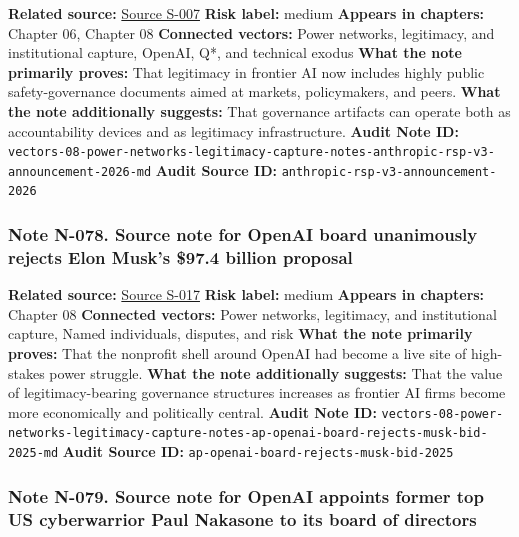 \documentclass[
  american,
  11pt,
  letterpaper,
]{article}
\begin{document}
\textbf{Related source:}
\hyperref[source-s-007-responsible-scaling-policy-version-3-0]{Source
S-007} \textbf{Risk label:} medium \textbf{Appears in chapters:} Chapter
06, Chapter 08 \textbf{Connected vectors:} Power networks, legitimacy,
and institutional capture, OpenAI, Q*, and technical exodus \textbf{What
the note primarily proves:} That legitimacy in frontier AI now includes
highly public safety-governance documents aimed at markets,
policymakers, and peers. \textbf{What the note additionally suggests:}
That governance artifacts can operate both as accountability devices and
as legitimacy infrastructure. \textbf{Audit Note ID:}
\texttt{vectors-08-power-networks-legitimacy-capture-notes-anthropic-rsp-v3-announcement-2026-md}
\textbf{Audit Source ID:} \texttt{anthropic-rsp-v3-announcement-2026}

\subsubsection{Note N-078. Source note for OpenAI board unanimously
rejects Elon Musk's \$97.4 billion
proposal}\label{note-n-078-vectors-08-power-networks-legitimacy-capture-notes-ap-openai-board-rejects-musk-bid-2025-md}

\textbf{Related source:}
\hyperref[source-s-017-openai-board-unanimously-rejects-elon-musk-s-97-4-billion-proposal]{Source
S-017} \textbf{Risk label:} medium \textbf{Appears in chapters:} Chapter
08 \textbf{Connected vectors:} Power networks, legitimacy, and
institutional capture, Named individuals, disputes, and risk
\textbf{What the note primarily proves:} That the nonprofit shell around
OpenAI had become a live site of high-stakes power struggle.
\textbf{What the note additionally suggests:} That the value of
legitimacy-bearing governance structures increases as frontier AI firms
become more economically and politically central. \textbf{Audit Note
ID:}
\texttt{vectors-08-power-networks-legitimacy-capture-notes-ap-openai-board-rejects-musk-bid-2025-md}
\textbf{Audit Source ID:} \texttt{ap-openai-board-rejects-musk-bid-2025}

\subsubsection{Note N-079. Source note for OpenAI appoints former top US
cyberwarrior Paul Nakasone to its board of
directors}\label{note-n-079-vectors-08-power-networks-legitimacy-capture-notes-ap-openai-nakasone-board-2024-md}
\end{document}
